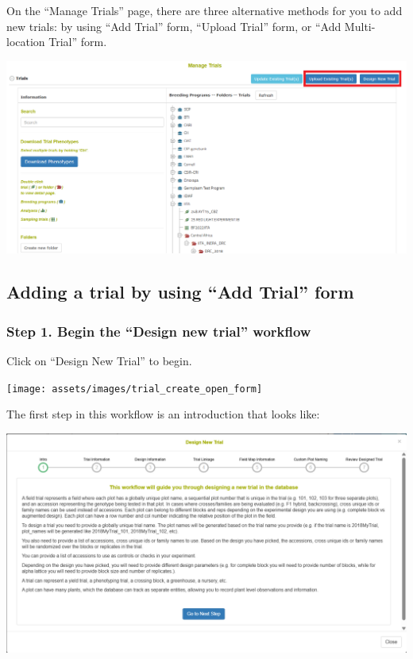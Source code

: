 \documentclass[
  12pt,
]{book}
\begin{document}
On the ``Manage Trials'' page, there are three alternative methods for you to add new trials: by using ``Add Trial'' form, ``Upload Trial'' form, or ``Add Multi-location Trial'' form.

\begin{center}\includegraphics[width=0.95\linewidth]{assets/images/trial_create_manage_trials} \end{center}

\hypertarget{adding-a-trial-by-using-add-trial-form}{%
\subsection{Adding a trial by using ``Add Trial'' form}\label{adding-a-trial-by-using-add-trial-form}}

\hypertarget{step-1.-begin-the-design-new-trial-workflow}{%
\subsubsection*{Step 1. Begin the ``Design new trial'' workflow}\label{step-1.-begin-the-design-new-trial-workflow}}


Click on ``Design New Trial'' to begin.

\begin{center}\texttt{[image: assets/images/trial\_create\_open\_form]} \end{center}

The first step in this workflow is an introduction that looks like:

\begin{center}\includegraphics[width=0.95\linewidth]{assets/images/trial_create_form_1} \end{center}
\end{document}
